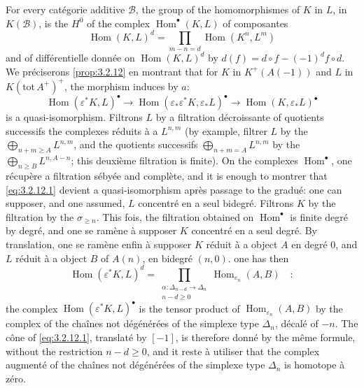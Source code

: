 \documentclass[12pt,a4paper]{article}
\theoremstyle{plain}
\theoremstyle{definition}
\DeclareMathOperator{\Hom}{Hom}
\newcommand{\cB}{\mathcal{B}}
\providecommand{\cB}{\mathcal{B}}
\providecommand{\Hom}{\operatorname{Hom}}
\begin{document}
For every cat\'{e}gorie additive $\cB$, the group of the homomorphismes of $K$ in $L$, in $K(\cB)$, is the $H^{0}$ of the complex $\Hom^{\bullet}(K,L)$ of composantes
\[
\Hom(K,L)^{d} = \prod_{m-n=d} \Hom(K^{n}, L^{m})
\]
and of diff\'{e}rentielle donn\'{e}e on $\Hom(K,L)^{d}$ by $d(f) = d \circ f - (-1)^{d} f \circ d$. We pr\'{e}ciserons \ref{prop:3.2.12} en montrant that for $K$ in $K^{+}(A(-1))$ and $L$ in $K(\mathrm{tot}\, A^{+})^{+}$, the morphism induces by $a$:
\begin{equation}\label{eq:3.2.12.1}
\Hom(\varepsilon^{*}K, L)^{\bullet} \longrightarrow \Hom(\varepsilon_{*}\varepsilon^{*}K, \varepsilon_{*}L)^{\bullet} \longrightarrow \Hom(K, \varepsilon_{*}L)^{\bullet}
\end{equation}
is a quasi-isomorphism. Filtrons $L$ by a filtration d\'{e}croissante of quotients successifs the complexes r\'{e}duits \`{a} a $L^{n,m}$ (by example, filtrer $L$ by the $\bigoplus_{n+m \geq A} L^{n,m}$, and the quotients successifs $\bigoplus_{n+m=A} L^{n,m}$ by the $\bigoplus_{n \geq B} L^{n,A-n}$; this deuxi\`{e}me filtration is finite). On the complexes $\Hom^{\bullet}$, one r\'{e}cup\`{e}re a filtration s\'{e}by\'{e}e and compl\`{e}te, and it is enough to montrer that \eqref{eq:3.2.12.1} devient a quasi-isomorphism apr\`{e}s passage to the gradu\'{e}: one can supposer, and one assumed, $L$ concentr\'{e} en a seul bidegr\'{e}. Filtrons $K$ by the filtration by the $\sigma_{\geq n}$. This fois, the filtration obtained on $\Hom^{\bullet}$ is finite degr\'{e} by degr\'{e}, and one se ram\`{e}ne \`{a} supposer $K$ concentr\'{e} en a seul degr\'{e}. By translation, one se ram\`{e}ne enfin \`{a} supposer $K$ r\'{e}duit \`{a} a object $A$ en degr\'{e} $0$, and $L$ r\'{e}duit \`{a} a object $B$ of $A(n)$, en bidegr\'{e} $(n,0)$. one has then
\[
\Hom(\varepsilon^{*}K, L)^{d} = \prod_{\substack{\alpha: \Delta_{n-d} \to \Delta_{n} \\ n-d \geq 0}} \Hom_{\varepsilon_{n}}(A, B)\quad:
\]
the complex $\Hom(\varepsilon^{*}K, L)^{\bullet}$ is the tensor product of $\Hom_{\varepsilon_{n}}(A,B)$ by the complex of the cha\^{i}nes not d\'{e}g\'{e}n\'{e}r\'{e}es of the simplexe type $\Delta_{n}$, d\'{e}cal\'{e} of $-n$. The c\^{o}ne of \eqref{eq:3.2.12.1}, translat\'{e} by $[-1]$, is therefore donn\'{e} by the m\^{e}me formule, without the restriction $n-d \geq 0$, and it reste \`{a} utiliser that the complex augment\'{e} of the cha\^{i}nes not d\'{e}g\'{e}n\'{e}r\'{e}es of the simplexe type $\Delta_{n}$ is homotope \`{a} z\'{e}ro.
\end{document}
